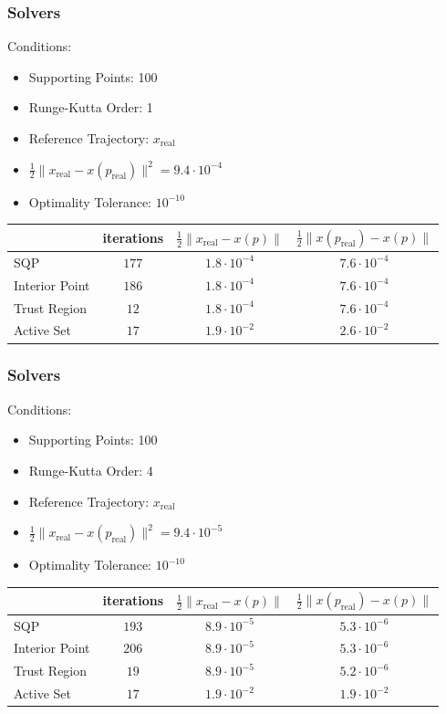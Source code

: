 \documentclass{beamer}
\begin{document}
\begin{frame}
    \frametitle{Solvers}
    Conditions:
    \begin{itemize}
        \item{Supporting Points: 100}
        \item{Runge-Kutta Order: 1}
        \item{Reference Trajectory: $x_{\text{real}}$}
        \item{$\frac{1}{2}\|x_{\text{real}} - x(p_\text{real})\|^2 = 9.4 \cdot 10^{-4}$}
        \item{Optimality Tolerance: $10^{-10}$}
    \end{itemize}

     \vspace{0.5cm}

     \begin{tabular}{l|ccc}
         & iterations & $\frac{1}{2}\|x_{\text{real}} - x(p)\|$ &  $\frac{1}{2}\|x(p_{\text{real}}) - x(p)\|$ \\
         \hline
         SQP             & $177$ & $1.8 \cdot 10^{-4}$ & $7.6 \cdot 10^{-4}$ \\
         Interior Point  & $186$ & $1.8 \cdot 10^{-4}$ & $7.6 \cdot 10^{-4}$ \\
         Trust Region    & $12$  & $1.8 \cdot 10^{-4}$ & $7.6 \cdot 10^{-4}$ \\
         Active Set      & $17$  & $1.9 \cdot 10^{-2}$ & $2.6 \cdot 10^{-2}$ \\
     \end{tabular}
\end{frame}

\begin{frame}
    \frametitle{Solvers}
    Conditions:
    \begin{itemize}
        \item{Supporting Points: 100}
        \item{Runge-Kutta Order: 4}
        \item{Reference Trajectory: $x_{\text{real}}$}
        \item{$\frac{1}{2}\|x_{\text{real}} - x(p_\text{real})\|^2 = 9.4 \cdot 10^{-5}$}
        \item{Optimality Tolerance: $10^{-10}$}
    \end{itemize}

     \vspace{0.5cm}

     \begin{tabular}{l|ccc}
         & iterations & $\frac{1}{2}\|x_{\text{real}} - x(p)\|$ &  $\frac{1}{2}\|x(p_{\text{real}}) - x(p)\|$ \\
         \hline
         SQP             & $193$ & $8.9 \cdot 10^{-5}$ & $5.3 \cdot 10^{-6}$ \\
         Interior Point  & $206$ & $8.9 \cdot 10^{-5}$ & $5.3 \cdot 10^{-6}$ \\
         Trust Region    & $19$  & $8.9 \cdot 10^{-5}$ & $5.2 \cdot 10^{-6}$ \\
         Active Set      & $17$  & $1.9 \cdot 10^{-2}$ & $1.9 \cdot 10^{-2}$ \\
     \end{tabular}
\end{frame}
\end{document}
